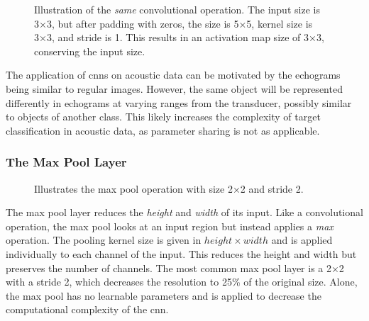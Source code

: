     \begin{figure}[H]
        \centering
        
        \caption[Same convolution example]{Illustration of the \textit{same} convolutional operation. The input size is 3×3, but after padding with zeros, the size is 5×5, kernel size is 3×3, and stride is 1. This results in an activation map size of 3×3, conserving the input size.}
      	\medskip 
        \label{same_convolutional_fig}
    \end{figure}
    
       The application of \gls{cnn}s on acoustic data can be motivated by the echograms being similar to regular images. However, the same object will be represented differently in echograms at varying ranges from the transducer, possibly similar to objects of another class\cite{simmonds2008fisheries}. This likely increases the complexity of target classification in acoustic data, as parameter sharing is not as applicable.
    
\subsubsection{The Max Pool Layer}

    \begin{figure}[H]
        \centering
                
        \caption[The max pool operation]{Illustrates the max pool operation with size 2×2 and stride 2.}
      	\medskip 
        \label{maxpool_fig}
    \end{figure}
    The max pool layer reduces the \textit{height} and \textit{width} of its input\cite{o2015introduction_convolutions}. Like a convolutional operation, the max pool looks at an input region but instead applies a \textit{max} operation. The pooling kernel size is given in $height \times width$ and is applied individually to each channel of the input. This reduces the height and width but preserves the number of channels. The most common max pool layer is a 2×2 with a stride 2, which decreases the resolution to 25\% of the original size. Alone, the max pool has no learnable parameters and is applied to decrease the computational complexity of the \gls{cnn}.


